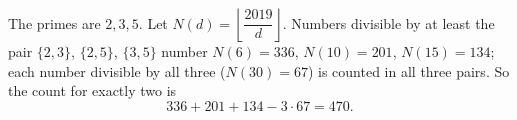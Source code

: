 The primes are $2,3,5$. Let $N(d)=\left\lfloor\dfrac{2019}d\right\rfloor$. Numbers divisible by at least the pair $\{2,3\}$, $\{2,5\}$, $\{3,5\}$ number $N(6)=336$, $N(10)=201$, $N(15)=134$; each number divisible by all three ($N(30)=67$) is counted in all three pairs. So the count for exactly two is
\[336+201+134-3\cdot67=\boxed{470}.\]
